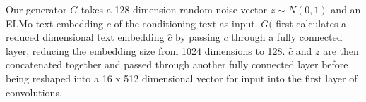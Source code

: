Our generator $G$ takes a 128 dimension random noise vector $z \sim N(0, 1)$ and an ELMo text embedding $c$ of the conditioning text as input. $G($ first calculates a reduced dimensional text embedding $\hat{c}$ by passing $c$ through a fully connected layer, reducing the embedding size from 1024 dimensions to 128. $\hat{c}$ and $z$ are then concatenated together and passed through another fully connected layer before being reshaped into a 16 x 512 dimensional vector for input into the first layer of convolutions.